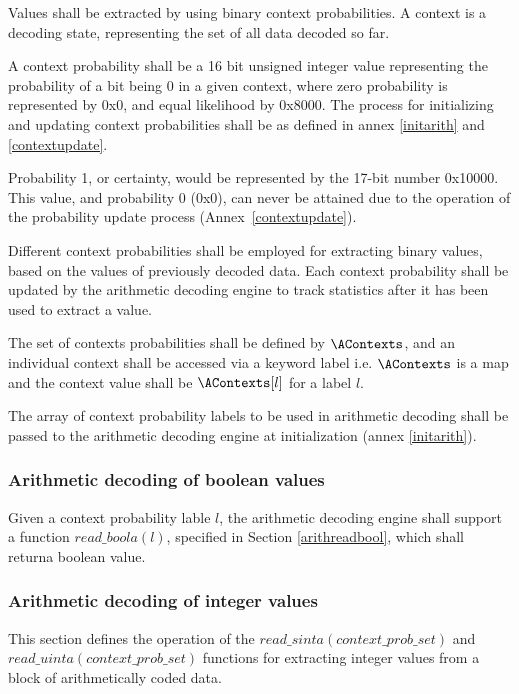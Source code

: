 Values shall be extracted by using binary context probabilities. A context is a 
decoding state, representing the set of all data decoded so far.

A context probability shall be a 16 bit unsigned integer value representing the 
probability of a bit being 0 in a given context, where zero probability is 
represented by 0x0, and equal likelihood by 0x8000. The process for initializing
 and updating context probabilities shall be as defined in annex 
\ref{initarith} and \ref{contextupdate}.

\begin{informative}
Probability 1, or certainty, would be represented by the 17-bit number 0x10000. 
This value, and probability 0 (0x0), can never be attained due to the operation 
of the probability update process (Annex~\ref{contextupdate}).
\end{informative}

Different context probabilities shall be employed for extracting binary values, 
based on the values of previously decoded data. Each context probability shall 
be updated by the arithmetic decoding engine to track statistics after it
has been used to extract a value.

The set of contexts probabilities shall be defined by $\AContexts$, and an 
individual context shall be accessed via a keyword label i.e. 
$\AContexts$ is a map and the context value shall be $\AContexts[l]$ for a 
label $l$.

The array of context probability labels to be used in arithmetic decoding shall 
be passed to the arithmetic decoding engine at initialization (annex 
\ref{initarith}).

\subsubsection{Arithmetic decoding of boolean values}

Given a context probability lable $l$, the arithmetic decoding engine shall support a function
$read\_boola(l)$, specified in Section \ref{arithreadbool}, which shall returna boolean value.

\subsubsection{Arithmetic decoding of integer values}

\label{arithreadint}

This section defines the operation of the $read\_sinta(context\_prob\_set)$ and
$read\_uinta(context\_prob\_set)$ functions
 for extracting integer values from a block of arithmetically coded data.

